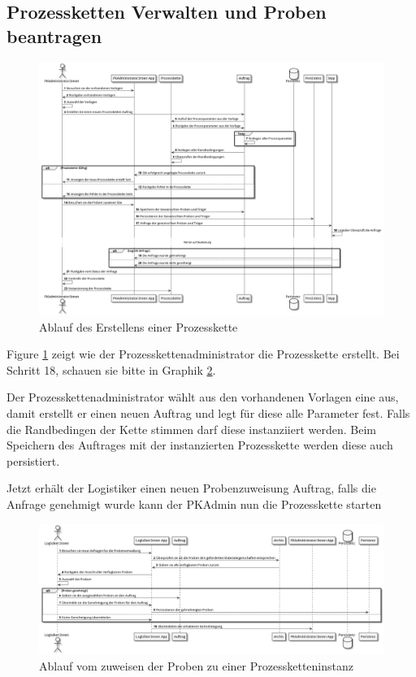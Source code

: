 \documentclass[enabledeprecatedfontcommands,fontsize=12pt,paper=a4,twoside]{scrartcl}
\begin{document}
\subsection{Prozessketten Verwalten und Proben beantragen}

\begin{figure}
  \includegraphics[width=\linewidth]{UML/pkErstellen.png}
  \caption{Ablauf des Erstellens einer Prozesskette}
  \label{fig:pkErstellen}
\end{figure}

Figure \ref{fig:pkErstellen} zeigt wie der Prozesskettenadministrator die Prozesskette erstellt. 
Bei Schritt 18, schauen sie bitte in Graphik \ref{fig:logstikProbenPüftZuweisen}. 

Der Prozesskettenadministrator wählt aus den vorhandenen Vorlagen eine aus, damit erstellt er einen neuen Auftrag und legt für diese alle Parameter fest.
Falls die Randbedingen der Kette stimmen darf diese instanziiert werden. Beim Speichern des Auftrages mit der instanzierten Prozesskette werden diese auch persistiert.

Jetzt erhält der Logistiker einen neuen Probenzuweisung Auftrag, falls die Anfrage genehmigt wurde kann der PKAdmin nun die Prozesskette starten

\begin{figure}
  \includegraphics[width=\linewidth]{UML/logstikProbenPueftZuweisen.png}
  \caption{Ablauf vom zuweisen der Proben zu einer Prozessketteninstanz}
  \label{fig:logstikProbenPüftZuweisen}
\end{figure}
\end{document}
